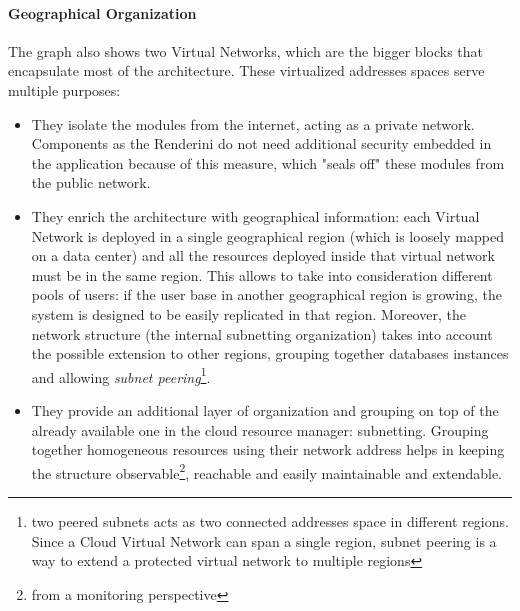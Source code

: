 \paragraph{Geographical Organization}
  The graph also shows two Virtual Networks, which are the bigger blocks that encapsulate most of the architecture. These virtualized addresses spaces serve multiple purposes:
  \begin{itemize}
    \item They isolate the modules from the internet, acting as a private network. Components as the Renderini do not need additional security embedded in the application because of this measure, which "seals off" these modules from the public network.
    \item They enrich the architecture with geographical information: each Virtual Network is deployed in a single geographical region (which is loosely mapped on a data center) and all the resources deployed inside that virtual network must be in the same region. This allows to take into consideration different pools of users: if the user base in another geographical region is growing, the system is designed to be easily replicated in that region. Moreover, the network structure (the internal subnetting organization) takes into account the possible extension to other regions, grouping together databases instances and allowing \textit{subnet peering}\footnote{two peered subnets acts as two connected addresses space in different regions. Since a Cloud Virtual Network can span a single region, subnet peering is a way to extend a protected virtual network to multiple regions}.
    \item They provide an additional layer of organization and grouping on top of the already available one in the cloud resource manager: subnetting. Grouping together homogeneous resources using their network address helps in keeping the structure observable\footnote{from a monitoring perspective}, reachable and easily maintainable and extendable.
  \end{itemize}

